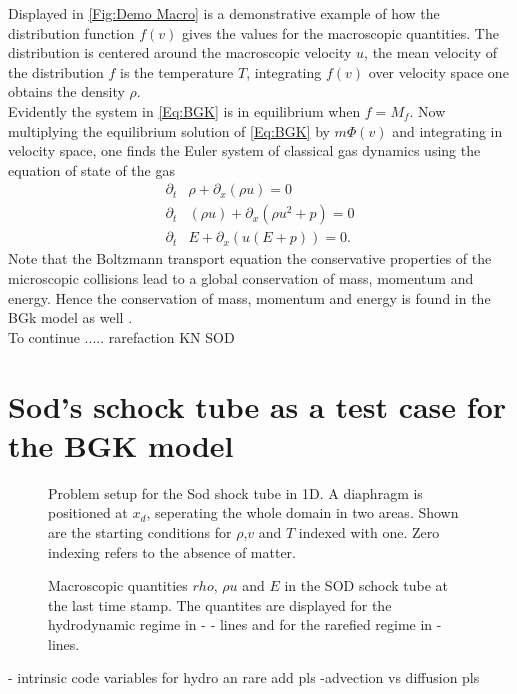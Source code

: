 Displayed in \cref{Fig:Demo Macro} is a demonstrative example of how the distribution function \(f(v)\) gives the values for the macroscopic quantities. The distribution is centered around the macroscopic velocity \(u\), the mean velocity of the distribution \(f\) is the temperature \(T\), integrating \(f(v)\) over velocity space one obtains the density \(\rho\).\\
Evidently the system in \cref{Eq:BGK} is in equilibrium when \(f = M_f\). Now multiplying the equilibrium solution of \cref{Eq:BGK} by \(m\Phi(v)\) and integrating in velocity space, one finds the Euler system of classical gas dynamics using the equation of state of the gas \cite{puppo2019kinetic}
\begin{align}
	\partial_t&\rho + \partial_x(\rho u) = 0
	\\
	\partial_t&(\rho u) + \partial_x(\rho u^2 + p) = 0
	\\
	\partial_t&E + \partial_x(u(E+p)) = 0 \textrm{.}
\end{align} 
Note that the Boltzmann transport equation the conservative properties of the microscopic collisions lead to a global conservation of mass, momentum and energy. Hence the conservation of mass, momentum and energy is found in the BGk model as well \cite{puppo2019kinetic}.\\
To continue .....
rarefaction KN
SOD
\begin{figure}[htbp!]
	
\end{figure}
\section{Sod's schock tube as a test case for the BGK model} \label{FeaturesSOD}
\begin{figure}
	\centering
	
	\caption{Problem setup for the Sod shock tube in 1D. A diaphragm is positioned at \(x_d\), seperating the whole domain in two areas. Shown are the starting conditions for \(\rho\),\(v\) and \(T\) indexed with one. Zero indexing refers to the absence of matter.}
	\label{Fig:SodProbSetup}
\end{figure}
\begin{figure}[!htbp]
	
	\caption{Macroscopic quantities \(rho\), \(\rho u\) and \(E\) in the SOD schock tube at the last time stamp. The quantites are displayed for the hydrodynamic regime in - - lines and for the rarefied regime in - lines.}
\end{figure}
- intrinsic code variables for hydro an rare add pls
-advection vs diffusion pls